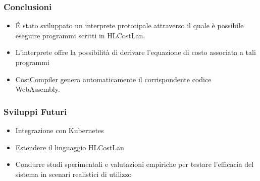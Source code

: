 \documentclass[xcolor=dvipsnames]{beamer}
\begin{document}
\begin{frame}
    \frametitle{Conclusioni}
    \begin{itemize}
        \item É stato sviluppato un \alert{interprete prototipale} attraverso il quale è possibile eseguire programmi scritti in HLCostLan.
        \item L'interprete offre la possibilità di derivare \alert{l'equazione di costo} associata a tali programmi
        \item CostCompiler genera automaticamente il corrispondente codice \alert{WebAssembly}.
    \end{itemize}
\end{frame}

\begin{frame}
    \frametitle{Sviluppi Futuri}
    \begin{itemize}
        \item Integrazione con Kubernetes
        \item Estendere il linguaggio HLCostLan
        \item Condurre studi sperimentali e valutazioni empiriche per testare l'efficacia del sistema in scenari realistici di utilizzo
    \end{itemize}
    

\end{frame}
\end{document}
